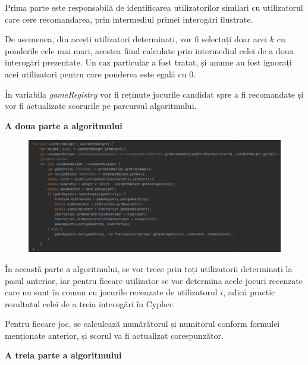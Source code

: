 \documentclass[12pt,a4paper]{report}
\begin{document}
Prima parte este responsabilă de identificarea utilizatorilor similari cu utilizatorul care cere recomandarea, prin intermediul primei interogări ilustrate.

De asemenea, din acești utilizatori determinați, vor fi selectați doar acei \( k \) cu ponderile cele mai mari, acestea fiind calculate prin intermediul celei de a doua interogări prezentate. Un caz particular a fost tratat, și anume au fost ignorați acei utilizatori pentru care ponderea este egală cu \( 0 \).

În variabila \emph{gameRegistry} vor fi reținute jocurile candidat spre a fi recomandate și vor fi actualizate scorurile pe parcursul algoritmului.

\bigskip
\textbf{A doua parte a algoritmului}
\bigskip

\begin{figure}[H]
\centering
\caption{}
\begin{adjustbox}{max size={\textwidth}{\textheight}}
\includegraphics[scale = 0.6]{exemplu_28_second_part}
\end{adjustbox}
\caption*{}
\end{figure}

În această parte a algoritmului, se vor trece prin toți utilizatorii determinați la pasul anterior, iar pentru fiecare utilizator se vor determina acele jocuri recenzate care nu sunt în comun cu jocurile recenzate de utilizatorul \( i \), adică practic rezultatul celei de a treia interogări în Cypher.

Pentru fiecare joc, se calculează numărătorul și numitorul conform formulei menționate anterior, și scorul va fi actualizat corespunzător.

\newpage

\bigskip
\textbf{A treia parte a algoritmului}
\bigskip
\end{document}
